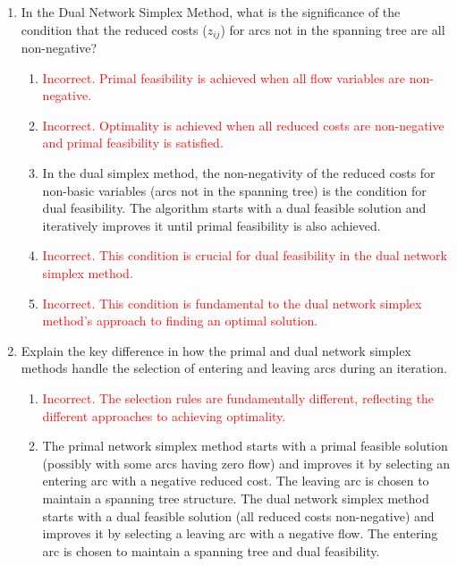 \documentclass{article}%
\newcommand{\incorrect}[1]{\textcolor{red}{#1}}
\begin{document}
\begin{enumerate}
\begin{enumerate}
\item \incorrect{Incorrect. While unbalanced supplies and demands would lead to an infeasible problem, the initial solution assumes balanced supplies and demands.}%
\item \incorrect{Incorrect. Negative arc costs do not directly cause infeasibility in the initial solution; they affect the optimality but not the feasibility.}%
\end{enumerate}%
\vspace{1em}%
\item In the Dual Network Simplex Method, what is the significance of the condition that the reduced costs ($z_{ij}$) for arcs not in the spanning tree are all non-negative?%
\begin{enumerate}%
\item \incorrect{Incorrect. Primal feasibility is achieved when all flow variables are non-negative.}%
\item \incorrect{Incorrect. Optimality is achieved when all reduced costs are non-negative and primal feasibility is satisfied.}%
\item In the dual simplex method, the non-negativity of the reduced costs for non-basic variables (arcs not in the spanning tree) is the condition for dual feasibility.  The algorithm starts with a dual feasible solution and iteratively improves it until primal feasibility is also achieved.%
\item \incorrect{Incorrect. This condition is crucial for dual feasibility in the dual network simplex method.}%
\item \incorrect{Incorrect. This condition is fundamental to the dual network simplex method's approach to finding an optimal solution.}%
\end{enumerate}%
\vspace{1em}%
\item Explain the key difference in how the primal and dual network simplex methods handle the selection of entering and leaving arcs during an iteration.%
\begin{enumerate}%
\item \incorrect{Incorrect. The selection rules are fundamentally different, reflecting the different approaches to achieving optimality.}%
\item The primal network simplex method starts with a primal feasible solution (possibly with some arcs having zero flow) and improves it by selecting an entering arc with a negative reduced cost. The leaving arc is chosen to maintain a spanning tree structure. The dual network simplex method starts with a dual feasible solution (all reduced costs non-negative) and improves it by selecting a leaving arc with a negative flow. The entering arc is chosen to maintain a spanning tree and dual feasibility.%

\end{enumerate}
\end{enumerate}
\end{document}
